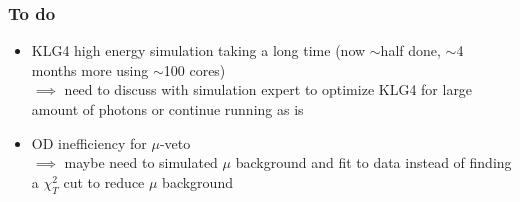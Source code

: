 \documentclass{beamer}
\begin{document}
\begin{frame}
	\frametitle{To do}
	\begin{itemize}
		\item KLG4 high energy simulation taking a long time (now $\sim$half
			done, $\sim$4 months more using $\sim$100 cores) \\
			$\implies$ need to discuss with simulation expert to optimize KLG4
			for large amount of photons or continue running as is
		\item OD inefficiency for $\mu$-veto \\
			$\implies$ maybe need to simulated $\mu$ background and fit to data
			instead of finding a $\chi_{T}^{2}$ cut to reduce $\mu$ background
	\end{itemize}
\end{frame}
\end{document}
